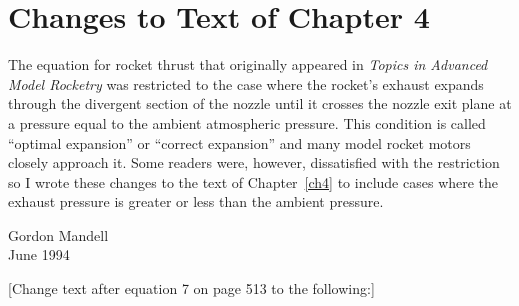 \chapter{Changes to Text of Chapter 4}\label{supp:ch4}

The equation for rocket thrust that originally appeared in \emph{Topics in Advanced Model Rocketry} was
restricted to the case where the rocket's exhaust expands through the divergent section of the nozzle until
it crosses the nozzle exit plane at a pressure equal to the ambient atmospheric pressure. This condition is
called ``optimal expansion'' or ``correct expansion'' and many model rocket motors closely approach it. Some
readers were, however, dissatisfied with the restriction so I wrote these changes to the text of
Chapter~\ref{ch4} to include cases where the exhaust pressure is greater or less than the ambient pressure.

\bigskip
\noindent Gordon Mandell\\
June 1994

\bigskip
\begin{center}
[Change text after equation 7 on page 513 to the following:]
\end{center}

